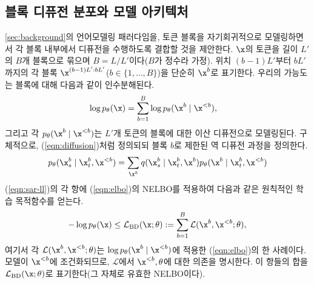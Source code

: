 \documentclass{article} %
\begin{document}
\subsection{블록 디퓨전 분포와 모델 아키텍처}\label{sec:sar-elbo}
\cref{sec:background}의 언어모델링 패러다임을, 토큰 블록을 자기회귀적으로 모델링하면서 각 블록 내부에서 디퓨전을 수행하도록 결합할 것을 제안한다.
$\x$의 토큰을 길이 $L'$의 $B$개 블록으로 묶으며 $B=L/L'$이다($B$가 정수라 가정). 위치 $(b-1)L'$부터 $bL'$까지의 각 블록 $\x^{(b-1)L':bL'}$($b \in \{ 1, \dots, B \}$)을 단순히 $\x^b$로 표기한다. 우리의 가능도는 블록에 대해 다음과 같이 인수분해된다.
\begin{align}\label{eqn:sar-ll}
     \log p_\theta(\x) &= \sum_{b = 1}^{B} \log p_\theta(\x^{b} \mid \x^{<b}),
\end{align}
그리고 각 $p_\theta(\x^b \mid \x^{<b})$는 $L'$개 토큰의 블록에 대한 이산 디퓨전으로 모델링된다.
구체적으로, (\ref{eqn:diffusion})처럼 정의되되 블록 $b$로 제한된 역 디퓨전 과정을 정의한다.
\begin{align}
    p_\theta(\x_s^b \mid \x_t^b, \x^{<b}) = \sum_{\x^b} q(\x_s^b \mid \x_t^b, \x^b)p_\theta(\x^b\mid \x^b_t,\x^{<b})
\end{align}
(\ref{eqn:sar-ll})의 각 항에 (\ref{eqn:elbo})의 NELBO를 적용하여 다음과 같은 원칙적인 학습 목적함수를 얻는다.
\begin{align}\label{eqn:sar-elbo}
    - \log p_\theta(\x) \leq \mathcal{L}_\text{BD}(\x; \theta) := \sum_{b=1}^{B} \mathcal{L}(\x^b, \x^{<b}; \theta),
\end{align}
여기서 각 $\mathcal{L}(\x^b, \x^{<b}; \theta)$는 $\log p_\theta(\x^{b} \mid \x^{<b})$에 적용한 (\ref{eqn:elbo})의 한 사례이다. 모델이 $\x^{<b}$에 조건화되므로, $\mathcal{L}$에서 $\x^{<b}, \theta$에 대한 의존을 명시한다.
이 항들의 합을 $\mathcal{L}_\text{BD}(\x; \theta)$로 표기한다(그 자체로 유효한 NELBO이다).
\end{document}
